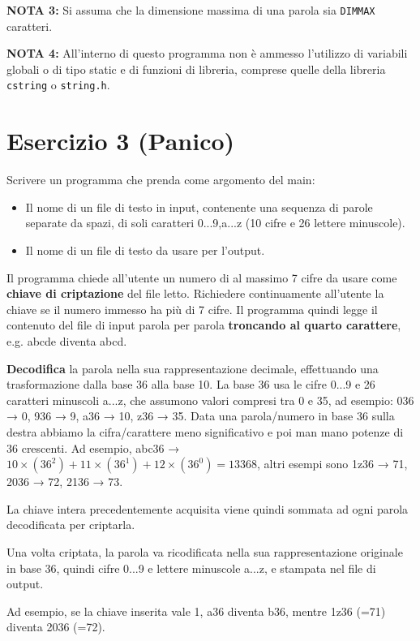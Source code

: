 \documentclass{article}
\begin{document}
    \textbf{NOTA 3:} Si assuma che la dimensione massima di una parola sia \texttt{DIMMAX} caratteri.

    \textbf{NOTA 4:} All'interno di questo programma non è ammesso l'utilizzo di variabili globali o di tipo static e di funzioni di libreria, comprese quelle della libreria \texttt{cstring} o \texttt{string.h}.

    \section*{Esercizio 3 (Panico)}

    Scrivere un programma che prenda come argomento del main:
    \begin{itemize}
        \item Il nome di un file di testo in input, contenente una sequenza di parole separate da spazi, di soli caratteri 0...9,a...z (10 cifre e 26 lettere minuscole).
        \item Il nome di un file di testo da usare per l'output.
    \end{itemize}

    Il programma chiede all'utente un numero di al massimo 7 cifre da usare come \textbf{chiave di criptazione} del file letto. Richiedere continuamente all'utente la chiave se il numero immesso ha più di 7 cifre. Il programma quindi legge il contenuto del file di input parola per parola \textbf{troncando al quarto carattere}, e.g. abcde diventa abcd.

    \textbf{Decodifica} la parola nella sua rappresentazione decimale, effettuando una trasformazione dalla base 36 alla base 10. La base 36 usa le cifre 0...9 e 26 caratteri minuscoli a...z, che assumono valori compresi tra 0 e 35, ad esempio: 036 → 0, 936 → 9, a36 → 10, z36 → 35. Data una parola/numero in base 36 sulla destra abbiamo la cifra/carattere meno significativo e poi man mano potenze di 36 crescenti. Ad esempio, abc36 → \(10 \times (36^2) + 11 \times (36^1) + 12 \times (36^0) = 13368\), altri esempi sono 1z36 → 71, 2036 → 72, 2136 → 73.

    La chiave intera precedentemente acquisita viene quindi sommata ad ogni parola decodificata per criptarla.

    Una volta criptata, la parola va ricodificata nella sua rappresentazione originale in base 36, quindi cifre 0...9 e lettere minuscole a...z, e stampata nel file di output.

    Ad esempio, se la chiave inserita vale 1, a36 diventa b36, mentre 1z36 (=71) diventa 2036 (=72). 
    
\end{document}
